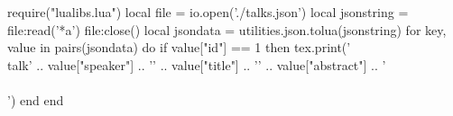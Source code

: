 \begin{luacode}
  require("lualibs.lua")
  local file = io.open('./talks.json')
  local jsonstring = file:read('*a')
  file:close()
  local jsondata =  utilities.json.tolua(jsonstring)
  for key, value in pairs(jsondata) do
    if value["id"] == 1 then 
        tex.print('\\talk{' .. 
          value["speaker"]  .. 
          '}{'              .. 
          value["title"]    .. 
          '}{'              .. 
          value["abstract"] .. 
          '}\\\\[1em]')
    end
  end
  \end{luacode}